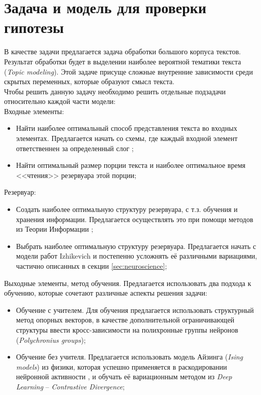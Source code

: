 \documentclass[a4paper,10pt]{article}
\begin{document}
\section{Задача и модель для проверки гипотезы}
В качестве задачи предлагается задача обработки большого корпуса текстов. Результат обработки будет в выделении наиболее вероятной тематики текста (\textit{Topic modeling}). Этой задаче присуще сложные внутренние зависимости среди скрытых переменных, которые образуют смысл текста.\\
\indent Чтобы решить данную задачу необходимо решить отдельные подзадачи относительно каждой части модели:\\
Входные элементы:
\begin{itemize}
\item Найти наиболее оптимальный способ представления текста во входных элементах. Предлагается начать со схемы, где каждый входной элемент ответственнен за определенный слог \cite{rnn_text};  
\item Найти оптимальный размер порции текста и наиболее оптимальное время <<чтения>> резервуара этой порции;
\end{itemize} 
Резервуар:
\begin{itemize}
\item Создать наиболее оптимальную структуру резервуара, с т.з. обучения и хранения информации. Предлагается осуществлять это при помощи методов из Теории Информации \cite{inf_th}; 
\item Выбрать наиболее оптимальную структуру резервуара. Предлагается начать с модели работ Izhikevich \cite{izh_groups} и постепенно усложнять её различными вариациями, частично описанных в секции \ref{sec:neuroscience};
\end{itemize}
Выходные элементы, метод обучения. Предлагается использовать два подхода к обучению, которые сочетают различные аспекты решения задачи:
\begin{itemize}
\item Обучение с учителем. Для обучения предлагается использовать структурный метод опорных векторов, в качестве дополнительной ограничивающей структуры ввести кросс-зависимости на полихронные группы нейронов (\textit{Polychronius groups});
\item Обучение без учителя. Предлагается использовать модель Айзинга (\textit{Ising models}) из физики, которая успешно применяется в раскодировании нейронной активности \cite{schneidman0, schneidman1}, и обучать её вариационным методом из \textit{Deep Learning} -- \textit{Contrastive Divergence}\cite{hinton2006};
\end{itemize} 
\end{document}
